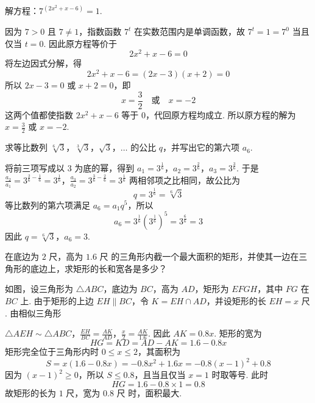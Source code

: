 \begin{problem}
解方程：\(7^{\left(2x^2+x-6\right)}=1\).
\end{problem}

\begin{solution}
因为 \(7>0\) 且 \(7\neq1\)，指数函数 \(7^t\) 在实数范围内是单调函数，故 \(7^t=1=7^0\) 当且仅当 \(t=0\). 因此原方程等价于
\[
2x^2+x-6=0
\]
将左边因式分解，得
\[
2x^2+x-6=(2x-3)(x+2)=0
\]
所以 \(2x-3=0\) 或 \(x+2=0\)，即
\[
x=\frac32\quad\text{或}\quad x=-2
\]
这两个值都使指数 \(2x^2+x-6\) 等于 \(0\)，代回原方程均成立. 所以原方程的解为 \(x=\frac32\) 或 \(x=-2\).
\end{solution}

\begin{problem}
求等比数列 \(\sqrt[6]{3}\)，\(\sqrt[3]{3}\)，\(\sqrt{3}\)，\(\ldots\) 的公比 \(q\)，并写出它的第六项 \(a_6\).
\end{problem}

\begin{solution}
将前三项写成以 \(3\) 为底的幂，得到
\(a_1=3^{\frac16}\)，\(a_2=3^{\frac26}\)，\(a_3=3^{\frac36}\).
于是
\(\frac{a_2}{a_1}=3^{\frac26-\frac16}=3^{\frac16}\)，\(\frac{a_3}{a_2}=3^{\frac36-\frac26}=3^{\frac16}\)
两相邻项之比相同，故公比为
\[
q=3^{\frac16}=\sqrt[6]{3}
\]
等比数列的第六项满足 \(a_6=a_1q^5\)，所以
\[
a_6=3^{\frac16}\left(3^{\frac16}\right)^5=3^{\frac66}=3
\]
因此 \(q=\sqrt[6]{3}\)，\(a_6=3\).
\end{solution}

\begin{problem}
在底边为 \(2\text{ 尺}\)，高为 \(1.6\text{ 尺}\) 的三角形内截一个最大面积的矩形，并使其一边在三角形的底边上，求矩形的长和宽各是多少？
\end{problem}

\begin{solution}
如图，设三角形为 \(\triangle ABC\)，底边为 \(BC\)，高为 \(AD\)，矩形为 \(EFGH\)，其中 \(FG\) 在 \(BC\) 上. 由于矩形的上边 \(EH\parallel BC\)，令 \(K=EH\cap AD\)，并设矩形的长 \(EH=x\text{ 尺}\). 由相似三角形


\(\triangle AEH\sim\triangle ABC\)，\(\frac{EH}{BC}=\frac{AK}{AD}\)，\(\frac{x}{2}=\frac{AK}{1.6}\).
因此 \(AK=0.8x\). 矩形的宽为
\[
HG=KD=AD-AK=1.6-0.8x
\]
矩形完全位于三角形内时 \(0\leq x\leq2\)，其面积为
\[
S=x\left(1.6-0.8x\right)=-0.8x^2+1.6x=-0.8\left(x-1\right)^2+0.8
\]
因为 \(\left(x-1\right)^2\geq0\)，所以 \(S\leq0.8\)，且当且仅当 \(x=1\) 时取等号. 此时
\[
HG=1.6-0.8\times1=0.8
\]
故矩形的长为 \(1\text{ 尺}\)，宽为 \(0.8\text{ 尺}\) 时，面积最大.
\end{solution}

